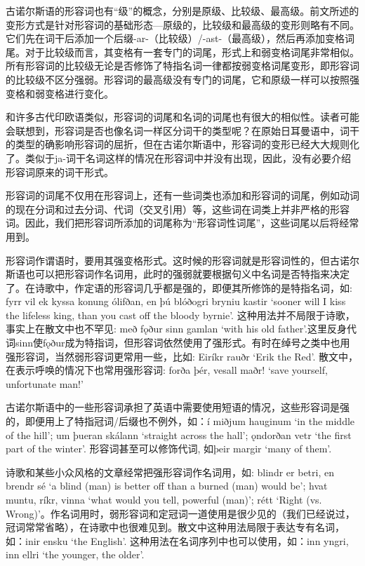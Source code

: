 古诺尔斯语的形容词也有``级''的概念，分别是原级、比较级、最高级。前文所述的变形方式是针对形容词的基础形态---原级的，比较级和最高级的变形则略有不同。它们先在词干后添加一个后缀-ar-（比较级）/-ast-（最高级），然后再添加变格词尾。对于比较级而言，其变格有一套专门的词尾，形式上和弱变格词尾非常相似。所有形容词的比较级无论是否修饰了特指名词一律都按弱变格词尾变形，即形容词的比较级不区分强弱。形容词的最高级没有专门的词尾，它和原级一样可以按照强变格和弱变格进行变化。

和许多古代印欧语类似，形容词的词尾和名词的词尾也有很大的相似性。读者可能会联想到，形容词是否也像名词一样区分词干的类型呢？在原始日耳曼语中，词干的类型的确影响形容词的屈折，但在古诺尔斯语中，形容词的变形已经大大规则化了。类似于ja-词干名词这样的情况在形容词中并没有出现，因此，没有必要介绍形容词原来的词干形式。

形容词的词尾不仅用在形容词上，还有一些词类也添加和形容词的词尾，例如动词的现在分词和过去分词、代词（交叉引用）等，这些词在词类上并非严格的形容词。因此，我们把形容词所添加的词尾称为``形容词性词尾''，这些词尾以后将经常用到。

形容词作谓语时，要用其强变格形式。这时候的形容词就是形容词性的，但古诺尔斯语也可以把形容词作名词用，此时的强弱就要根据句义中名词是否特指来决定了。在诗歌中，作定语的形容词几乎都是强的，即便其所修饰的是特指名词，如:
fyrr vil ek kyssa konung ólifðan, en þú blóðogri bryniu kastir `sooner
will I kiss the lifeless king, than you cast off the bloody byrnie‌'.
这种用法并不局限于诗歌，事实上在散文中也不罕见: með fǫður sinn gamlan
`with his old
father‌'.这里反身代词sinn使fǫður成为特指词，但形容词依然使用了强形式。有时在绰号之类中也用强形容词，当然弱形容词更常用一些，比如:
Eiríkr rauðr `Erik the Red‌'. 散文中，在表示呼唤的情况下也常用强形容词:
forða þér, vesall maðr! `save yourself, unfortunate man!‌'

古诺尔斯语中的一些形容词承担了英语中需要使用短语的情况，这些形容词是强的，即便用上了特指冠词/后缀也不例外，如：í
miðjum hauginum `in the middle of the hill‌'; um þueran skálann `straight
across the hall‌'; ǫndorðan vetr `the first part of the winter‌'.
形容词甚至可以修饰代词, 如þeir margir `many of them‌'.

诗歌和某些小众风格的文章经常把强形容词作名词用，如: blindr er betri, en
brendr sé `a blind (man) is better off than a burned (man) would be‌';
hvat muntu, ríkr, vinna `what would you tell, powerful (man)‌'; rétt
`Right (vs.
Wrong)‌'。作名词用时，弱形容词和定冠词一道使用是很少见的（我们已经说过，冠词常常省略），在诗歌中也很难见到。散文中这种用法局限于表达专有名词，如：inir
ensku `the English‌'. 这种用法在名词序列中也可以使用，如：inn yngri, inn
ellri `the younger, the older‌'.

